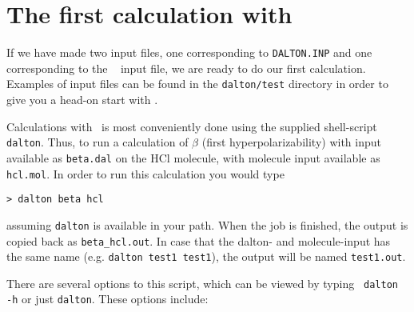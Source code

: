 \section{The first calculation with \siraba\ }\label{sec:firstcalc}

If we have made two input files, one corresponding to
\verb|DALTON.INP| and one corresponding to the \mol\
 input file, we 
are ready to do our first calculation. Examples of input files can be
found in the \verb|dalton/test| directory in order to give you a
head-on start with \siraba .

Calculations with \siraba\ is most conveniently done using the
supplied shell-script \verb|dalton|. Thus,
to run a calculation of 
$\beta$ (first hyperpolarizability)
with input available as 
\verb|beta.dal| on the HCl molecule, with molecule input available as
\verb|hcl.mol|. In order to run this calculation you would type

\begin{verbatim}
> dalton beta hcl
\end{verbatim}
assuming \verb|dalton| is available in your path. When the job is
finished, the output is copied back as \verb|beta_hcl.out|. In case that the
dalton- and molecule-input has the same name (e.g. \verb|dalton test1 test1|), the output will be named \verb|test1.out|.

There are several options to this script, which can be viewed by
typing \verb| dalton -h| or just \verb|dalton|. These options include:

